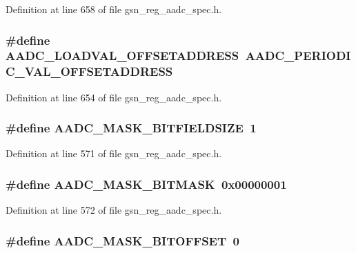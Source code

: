 Definition at line 658 of file gsn\_\-reg\_\-aadc\_\-spec.h.

\hypertarget{a00543_a077a25cb64b9e9d3599a4917f6c08f43}{
\subsubsection[{AADC\_\-LOADVAL\_\-OFFSETADDRESS}]{\setlength{\rightskip}{0pt plus 5cm}\#define AADC\_\-LOADVAL\_\-OFFSETADDRESS~AADC\_\-PERIODIC\_\-VAL\_\-OFFSETADDRESS}}
\label{a00543_a077a25cb64b9e9d3599a4917f6c08f43}


Definition at line 654 of file gsn\_\-reg\_\-aadc\_\-spec.h.

\hypertarget{a00543_a128a28cb1d25fd2f2c3e003fbe6c60ad}{
\subsubsection[{AADC\_\-MASK\_\-BITFIELDSIZE}]{\setlength{\rightskip}{0pt plus 5cm}\#define AADC\_\-MASK\_\-BITFIELDSIZE~1}}
\label{a00543_a128a28cb1d25fd2f2c3e003fbe6c60ad}


Definition at line 571 of file gsn\_\-reg\_\-aadc\_\-spec.h.

\hypertarget{a00543_a4243014e2a6dc466d281580d5fafc417}{
\subsubsection[{AADC\_\-MASK\_\-BITMASK}]{\setlength{\rightskip}{0pt plus 5cm}\#define AADC\_\-MASK\_\-BITMASK~0x00000001}}
\label{a00543_a4243014e2a6dc466d281580d5fafc417}


Definition at line 572 of file gsn\_\-reg\_\-aadc\_\-spec.h.

\hypertarget{a00543_ae106fa4e4bd4e3760861cb4395c205e4}{
\subsubsection[{AADC\_\-MASK\_\-BITOFFSET}]{\setlength{\rightskip}{0pt plus 5cm}\#define AADC\_\-MASK\_\-BITOFFSET~0}}
\label{a00543_ae106fa4e4bd4e3760861cb4395c205e4}


